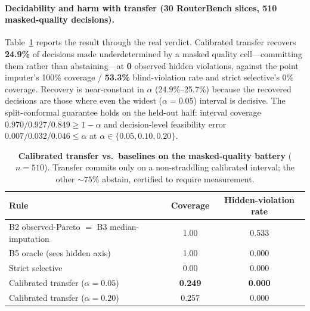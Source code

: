 \documentclass{article} %
\begin{document}
\paragraph{Decidability and harm with transfer (30 RouterBench slices, 510 masked-quality decisions).}
Table~\ref{tab:transfer} reports the result through the real verdict. Calibrated transfer recovers \textbf{24.9\%} of decisions made underdetermined by a masked quality cell---committing them rather than abstaining---at \textbf{0} observed hidden violations, against the point imputer's 100\% coverage / \textbf{53.3\%} blind-violation rate and strict selective's 0\% coverage. Recovery is near-constant in $\alpha$ (24.9\%--25.7\%) because the recovered decisions are those where even the widest ($\alpha{=}0.05$) interval is decisive. The split-conformal guarantee holds on the held-out half: interval coverage $0.970/0.927/0.849 \ge 1-\alpha$ and decision-level feasibility error $0.007/0.032/0.046 \le \alpha$ at $\alpha\in\{0.05,0.10,0.20\}$.

\begin{table}[h]
\centering
\caption{\textbf{Calibrated transfer vs.\ baselines on the masked-quality battery} ($n{=}510$). Transfer commits only on a non-straddling calibrated interval; the other ${\sim}75\%$ abstain, certified to require measurement.}
\label{tab:transfer}
\footnotesize
\begin{tabular}{lcc}
\toprule
Rule & Coverage & Hidden-violation rate \\
\midrule
B2 observed-Pareto $=$ B3 median-imputation & 1.00 & 0.533 \\
B5 oracle (sees hidden axis) & 1.00 & 0.000 \\
Strict selective & 0.00 & 0.000 \\
Calibrated transfer ($\alpha{=}0.05$) & \textbf{0.249} & \textbf{0.000} \\
Calibrated transfer ($\alpha{=}0.20$) & 0.257 & 0.000 \\
\bottomrule
\end{tabular}
\end{table}
\end{document}

